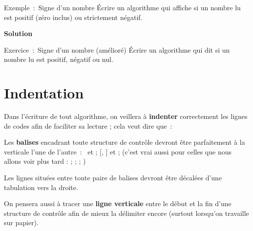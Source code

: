 \begin{Emphase}[exercice]{Exemple~:~Signe d’un nombre}
Écrire un algorithme qui affiche si un nombre lu est positif (zéro inclus)
ou strictement négatif.

{\bfseries Solution}

\end{Emphase}


\begin{Emphase}[exercice]{Exercice~:~Signe d’un nombre (amélioré)}
Écrire un algorithme qui dit si un nombre lu est positif, négatif ou
nul.
\end{Emphase}

\section{Indentation}

Dans l’écriture de tout algorithme, on veillera à \textbf{indenter}
correctement les lignes de codes afin de faciliter sa lecture ; cela
veut dire que~:

\begin{liste}
\item {
Les \textbf{balises} encadrant toute structure de contrôle devront être
parfaitement à la verticale l’une de l’autre~:~
et   ; 
[, ] et 
 ; (c’est vrai aussi pour celles que nous allons voir plus tard
:   ; 
 ; 
 
 ; )}
\item {
Les lignes situées entre toute paire de balises devront être décalées
d’une tabulation vers la droite.}
\item {
On pensera aussi à tracer une \textbf{ligne verticale} entre le début et la
fin d’une structure de contrôle afin de mieux la
délimiter encore (surtout lorsqu’on travaille sur papier). }
\end{liste}

